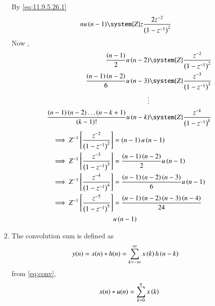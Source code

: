 \begin{enumerate}
    By \eqref{eq:11.9.5.26.1} 
    \begin{align}
         nu\brak{n-1}&\system{Z} z\frac{2z^{-2}}{\brak{1-z^{-1}}^2}
    \end{align}
    Now , 
    \begin{align}
         \frac{\brak{n-1}}{2}u\brak{n-2} & \system{Z} \frac{z^{-2}}{\brak{1-z^{-1}}^2} \\
         \frac{\brak{n-1}\brak{n-2}}{6}u\brak{n-3}&\system{Z} \frac{z^{-3}}{\brak{1-z^{-1}}^3}\\
         \vdots \notag \\
          \frac{\brak{n-1}\brak{n-2}\ldots \brak{n-k+1}}{\brak{k-1}!}u\brak{n-k}&\system{Z} \frac{z^{-k}}{\brak{1-z^{-1}}^k}\label{eq:11.9.5.26.8}
    \end{align}
    \begin{align}
    \implies    Z^{-1}\left[\frac{z^{-2}}{\left(1-z^{-1}\right)^2}\right]&=\left(n-1\right)u\left(n-1\right)\label{eq:11.9.5.26.9} \\
     \implies     Z^{-1}\left[\frac{z^{-3}}{\left(1-z^{-1}\right)^3}\right]&=\frac{\left(n-1\right)\left(n-2\right)}{2}u\left(n-1\right)\label{eq:11.9.5.26.10} \\
    \implies      Z^{-1}\left[\frac{z^{-4}}{\left(1-z^{-1}\right)^4}\right]&=\frac{\left(n-1\right)\left(n-2\right)\left(n-3\right)}{6}u\left(n-1\right)\label{eq:11.9.5.26.11} \\
    \implies      Z^{-1}\left[\frac{z^{-5}}{\left(1-z^{-1}\right)^5}\right]&=\frac{\left(n-1\right)\left(n-2\right)\left(n-3\right)\left(n-4\right)}{24}\label{eq:11.9.5.26.12}\\ &u\left(n-1\right) \notag 
    \end{align}
    \item The convolution sum is defined as
    \begin{align}
        y(n) &= x(n)* h(n) = \sum_{k=-\infty}^{\infty}x\left(k\right)h\left(n-k\right)
        \label{eq:conv}
    \end{align}
    from 
        \eqref{eq:conv},
    \begin{align}
        x(n)*u(n)  = \sum_{k=0}^{n}x\left(k\right)
        \label{eq:conv-sum}
    \end{align}
    
    \end{enumerate}
    
